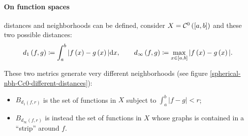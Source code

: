 \paragraph{On function spaces} distances and neighborhoods can be defined, consider $X=\mathcal C^0\left(\left[a,b\right]\right)$ and these two possible distances:
$$
	d_1\left(f,g\right) 
	\coloneqq \int_{a}^{b}|f\left(x\right)-g\left(x\right)|\mathrm d x, 
	\qquad d_\infty\left(f,g\right) 
	\coloneqq \max_{x\in\left[a,b\right]}|f\left(x\right)-g\left(x\right)|
.
$$

These two metrics generate very different neighborhoods (see figure \vref{spherical-nbh-Cc0-different-distances}):
\begin{itemize}
	\item $B_{d_1\left(f, r\right)}$ is the set of functions in $X$ subject to $\int_a^b |f-g| < r$;
	\item $B_{d_\infty\left(f, r\right)}$ is instead the set of functions in $X$ whose graphs is contained in a ``strip'' around $f$.
\end{itemize}

